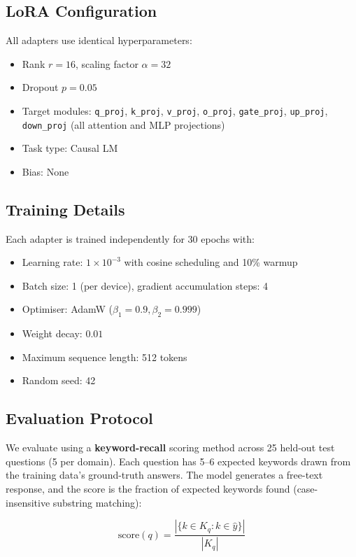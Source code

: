 \documentclass[conference, 10pt]{IEEEtran}
\begin{document}
\subsection{LoRA Configuration}
All adapters use identical hyperparameters:

\begin{itemize}
    \item Rank $r = 16$, scaling factor $\alpha = 32$
    \item Dropout $p = 0.05$
    \item Target modules: \texttt{q\_proj}, \texttt{k\_proj},
          \texttt{v\_proj}, \texttt{o\_proj}, \texttt{gate\_proj},
          \texttt{up\_proj}, \texttt{down\_proj} (all attention and
          MLP projections)
    \item Task type: Causal LM
    \item Bias: None
\end{itemize}

\subsection{Training Details}
Each adapter is trained independently for 30 epochs with:
\begin{itemize}
    \item Learning rate: $1 \times 10^{-3}$ with cosine scheduling and
          10\% warmup
    \item Batch size: 1 (per device), gradient accumulation steps: 4
    \item Optimiser: AdamW ($\beta_1 = 0.9, \beta_2 = 0.999$)
    \item Weight decay: $0.01$
    \item Maximum sequence length: 512 tokens
    \item Random seed: 42
\end{itemize}

\subsection{Evaluation Protocol}
\label{sec:eval-protocol}

We evaluate using a \textbf{keyword-recall} scoring method across 25
held-out test questions (5 per domain).
Each question has 5--6 expected keywords drawn from the training data's
ground-truth answers.
The model generates a free-text response, and the score is the fraction
of expected keywords found (case-insensitive substring matching):

\begin{equation}
    \text{score}(q) = \frac{|\{k \in K_q : k \in \hat{y}\}|}{|K_q|}
\end{equation}
\end{document}
